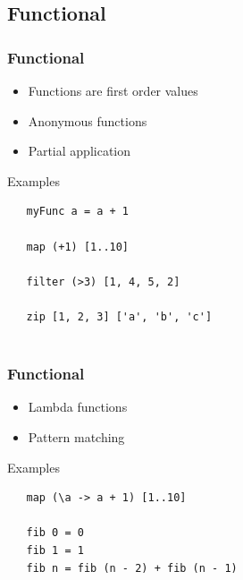 \documentclass{beamer}
\begin{document}
\subsection{Functional}
\begin{frame}[fragile]
\frametitle{Functional}

 \begin{itemize}
  \item Functions are first order values
  \item Anonymous functions
  \item Partial application
 \end{itemize}

 \vspace{0.5cm}
 \begin{block}{Examples}

  \begin{lstlisting} 
   myFunc a = a + 1
  
   map (+1) [1..10]
  
   filter (>3) [1, 4, 5, 2]
  
   zip [1, 2, 3] ['a', 'b', 'c']
  
  \end{lstlisting}
  
 \end{block}

\end{frame}

\begin{frame}[fragile]
\frametitle{Functional}
 
 \begin{itemize}
  \item Lambda functions
  \item Pattern matching	  
 \end{itemize}

 \vspace{0.5cm}
 \begin{block}{Examples}

  \begin{lstlisting} 
   map (\a -> a + 1) [1..10]
  
   fib 0 = 0
   fib 1 = 1
   fib n = fib (n - 2) + fib (n - 1)
  
  \end{lstlisting}
 \end{block}

\end{frame}
\end{document}
